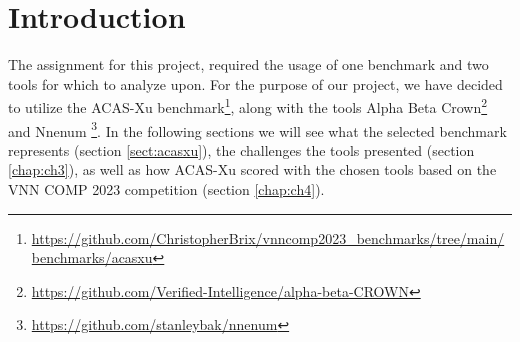 \section{Introduction}\label{cap:intro}

The assignment for this project, required the usage of one benchmark and two tools for which to analyze upon. For the purpose of our project, we have decided to utilize the ACAS-Xu benchmark\footnote{\url{https://github.com/ChristopherBrix/vnncomp2023_benchmarks/tree/main/benchmarks/acasxu}}, along with the tools Alpha Beta Crown\footnote{\url{https://github.com/Verified-Intelligence/alpha-beta-CROWN}} and Nnenum \footnote{\url{https://github.com/stanleybak/nnenum}}.
In the following sections we will see what the selected benchmark represents (section \ref{sect:acasxu}), the challenges the tools presented (section \ref{chap:ch3}), as well as how ACAS-Xu scored with the chosen tools based on the VNN COMP 2023 competition (section \ref{chap:ch4}).

